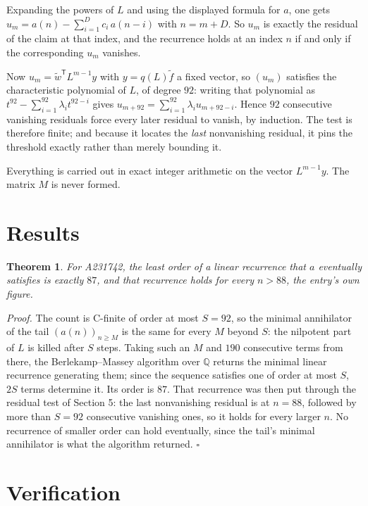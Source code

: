 \documentclass[11pt]{article}
\newtheorem{theorem}{Theorem}
\theoremstyle{definition}
\begin{document}
Expanding the powers of $L$ and using the displayed formula for $a$, one gets $u_m = a(n) - \sum_{i=1}^{D} c_i\,a(n-i)$ with $n = m + D$. So $u_m$ is exactly the residual of the claim at that index, and the recurrence holds at an index $n$ if and only if the corresponding $u_m$ vanishes.

Now $u_m = \tilde w^{\mathsf T} L^{m-1} y$ with $y = q(L)\tilde f$ a fixed vector, so $(u_m)$ satisfies the characteristic polynomial of $L$, of degree $92$: writing that polynomial as $t^{92} - \sum_{i=1}^{92} \lambda_i t^{92-i}$ gives $u_{m+92} = \sum_{i=1}^{92} \lambda_i u_{m+92-i}$. Hence $92$ consecutive vanishing residuals force every later residual to vanish, by induction. The test is therefore finite; and because it locates the {\itshape last} nonvanishing residual, it pins the threshold exactly rather than merely bounding it.

Everything is carried out in exact integer arithmetic on the vector $L^{m-1}y$. The matrix $M$ is never formed.

\section{Results}

\begin{theorem} For A231742, the least order of a linear recurrence that $a$ eventually satisfies is exactly $87$, and that recurrence holds for every $n > 88$, the entry's own figure.\end{theorem}

{\itshape Proof.} The count is C-finite of order at most $S = 92$, so the minimal annihilator of the tail $(a(n))_{n \ge M}$ is the same for every $M$ beyond $S$: the nilpotent part of $L$ is killed after $S$ steps. Taking such an $M$ and $190$ consecutive terms from there, the Berlekamp--Massey algorithm over $\mathbb{Q}$ returns the minimal linear recurrence generating them; since the sequence satisfies one of order at most $S$, $2S$ terms determine it. Its order is $87$. That recurrence was then put through the residual test of Section 5: the last nonvanishing residual is at $n = 88$, followed by more than $S = 92$ consecutive vanishing ones, so it holds for every larger $n$. No recurrence of smaller order can hold eventually, since the tail's minimal annihilator is what the algorithm returned. $\square$

\section{Verification}
\end{document}
